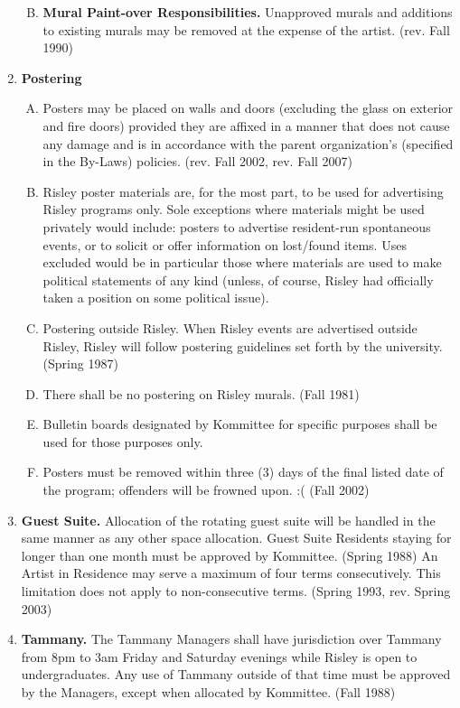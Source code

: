 \documentclass[12pt]{article}
\begin{document}
\begin{enumerate}[1.]
\begin{enumerate}[A.]
\begin{enumerate}[a.]
\end{enumerate}
\item \textbf{Mural Paint-over Responsibilities.} Unapproved murals and additions to existing murals may be removed at the expense of the artist. (rev. Fall 1990)
\end{enumerate}
\item \textbf{Postering}
\begin{enumerate}[A.]
\item Posters may be placed on walls and doors (excluding the glass on exterior and fire doors) provided they are affixed in a manner that does not cause any damage and is in accordance with the parent organization's (specified in the By-Laws) policies. (rev. Fall 2002, rev. Fall 2007) 
\item Risley poster materials are, for the most part, to be used for advertising Risley programs only. Sole exceptions where materials might be used privately would include: posters to advertise resident-run spontaneous events, or to solicit or offer information on lost/found items. Uses excluded would be in particular those where materials are used to make political statements of any kind (unless, of course, Risley had officially taken a position on some political issue). 
\item Postering outside Risley. When Risley events are advertised outside Risley, Risley will follow postering guidelines set forth by the university. (Spring 1987) 
\item There shall be no postering on Risley murals. (Fall 1981) 
\item Bulletin boards designated by Kommittee for specific purposes shall be used for those purposes only. 
\item Posters must be removed within three (3) days of the final listed date of the program; offenders will be frowned upon. :( (Fall 2002)
\end{enumerate}
\item \textbf{Guest Suite.} Allocation of the rotating guest suite will be handled in the same manner as any other space allocation. Guest Suite Residents staying for longer than one month must be approved by Kommittee. (Spring 1988) An Artist in Residence may serve a maximum of four terms consecutively. This limitation does not apply to non-consecutive terms. (Spring 1993, rev. Spring 2003)
\item \textbf{Tammany.} The Tammany Managers shall have jurisdiction over Tammany from 8pm to 3am Friday and Saturday evenings while Risley is open to undergraduates. Any use of Tammany outside of that time must be approved by the Managers, except when allocated by Kommittee. (Fall 1988)

\end{enumerate}
\end{document}
